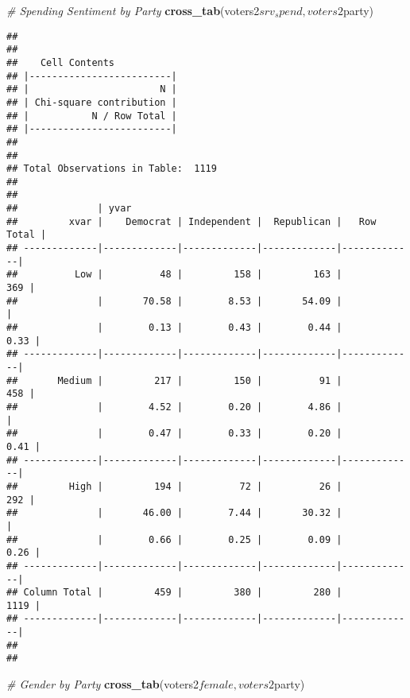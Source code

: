 \documentclass[]{article}
\newenvironment{Shaded}{\begin{snugshade}}{\end{snugshade}}
\newcommand{\KeywordTok}[1]{\textcolor[rgb]{0.13,0.29,0.53}{\textbf{{#1}}}}
\newcommand{\CommentTok}[1]{\textcolor[rgb]{0.56,0.35,0.01}{\textit{{#1}}}}
\newcommand{\NormalTok}[1]{{#1}}
\begin{document}
\begin{Shaded}
\begin{Highlighting}[]
\CommentTok{# Spending Sentiment by Party}
\KeywordTok{cross_tab}\NormalTok{(voters2$srv_spend, voters2$party)}
\end{Highlighting}
\end{Shaded}

\begin{verbatim}
## 
##  
##    Cell Contents
## |-------------------------|
## |                       N |
## | Chi-square contribution |
## |           N / Row Total |
## |-------------------------|
## 
##  
## Total Observations in Table:  1119 
## 
##  
##              | yvar 
##         xvar |    Democrat | Independent |  Republican |   Row Total | 
## -------------|-------------|-------------|-------------|-------------|
##          Low |          48 |         158 |         163 |         369 | 
##              |       70.58 |        8.53 |       54.09 |             | 
##              |        0.13 |        0.43 |        0.44 |        0.33 | 
## -------------|-------------|-------------|-------------|-------------|
##       Medium |         217 |         150 |          91 |         458 | 
##              |        4.52 |        0.20 |        4.86 |             | 
##              |        0.47 |        0.33 |        0.20 |        0.41 | 
## -------------|-------------|-------------|-------------|-------------|
##         High |         194 |          72 |          26 |         292 | 
##              |       46.00 |        7.44 |       30.32 |             | 
##              |        0.66 |        0.25 |        0.09 |        0.26 | 
## -------------|-------------|-------------|-------------|-------------|
## Column Total |         459 |         380 |         280 |        1119 | 
## -------------|-------------|-------------|-------------|-------------|
## 
## 
\end{verbatim}

\begin{Shaded}
\begin{Highlighting}[]
\CommentTok{# Gender by Party}
\KeywordTok{cross_tab}\NormalTok{(voters2$female, voters2$party)}
\end{Highlighting}
\end{Shaded}
\end{document}

